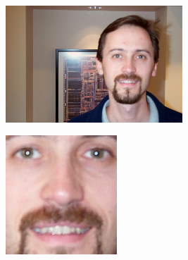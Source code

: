 \begin{figure}[H]
\begin{subfigure}{0.65\textwidth}
\begin{subfigure}{.33\textwidth}
  \caption{}
\end{subfigure}%
\end{subfigure}%
\begin{subfigure}{0.65\textwidth}
\begin{subfigure}{.33\textwidth}
  \centering
  \includegraphics[width=0.95\textwidth]{img/fdResult1/input18.png}
  \caption{}
\end{subfigure}%
\begin{subfigure}{.33\textwidth}
  \centering
  \includegraphics[width=0.6\textwidth]{img/fdResult1/output18.png}
  \caption{}
\end{subfigure}%
\end{subfigure}%


\end{figure}
